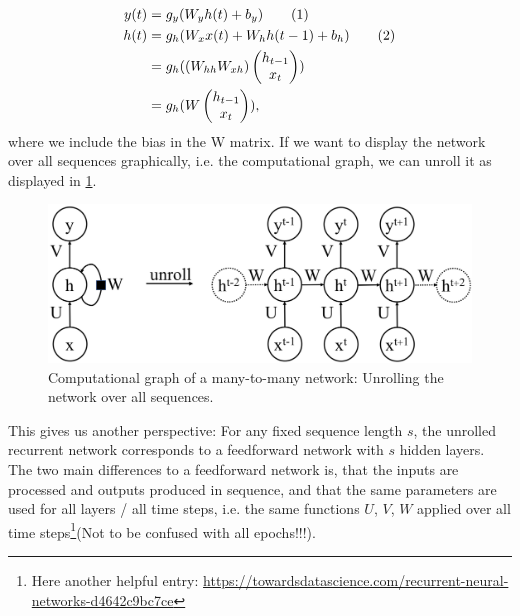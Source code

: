 \documentclass[main]{subfiles}
\begin{document}
\begin{align*}
    y(t) &= g_y(W_y h(t) + b_y) \tag{1}\\
    h(t) &= g_h(W_x x(t) + W_h h(t-1) + b_h) \tag{2}\\
    &= g_h((W_{hh}W_{xh}) \begin{pmatrix}h_{t-1}\\ x_t\end{pmatrix})\\ 
    &= g_h(W \begin{pmatrix}h_{t-1}\\ x_t\end{pmatrix}),
\end{align*}
where we include the bias in the W matrix. If we want to display the network over all sequences graphically, i.e. the computational graph, we can unroll it as displayed in \cref{fig:unroll}. 

\begin{figure}[H]
    \centering
    \includegraphics[width=0.99\linewidth]{13_LearningInRecurrentNeuronalNetworks/figures/unrolling.png}
    \caption{Computational graph of a many-to-many network: Unrolling the network over all sequences.}
    \label{fig:unroll}
\end{figure}

This gives us another perspective: For any fixed sequence length $s$, the unrolled recurrent network corresponds to a feedforward network with $s$ hidden layers. The two main differences to a feedforward network is, that the inputs are processed and outputs produced in sequence, and that the same parameters are used for all layers / all time steps, i.e. the same functions $U$, $V$, $W$ applied over all time steps\footnote{Here another helpful entry: \url{https://towardsdatascience.com/recurrent-neural-networks-d4642c9bc7ce}}(Not to be confused with all epochs!!!).
\end{document}
